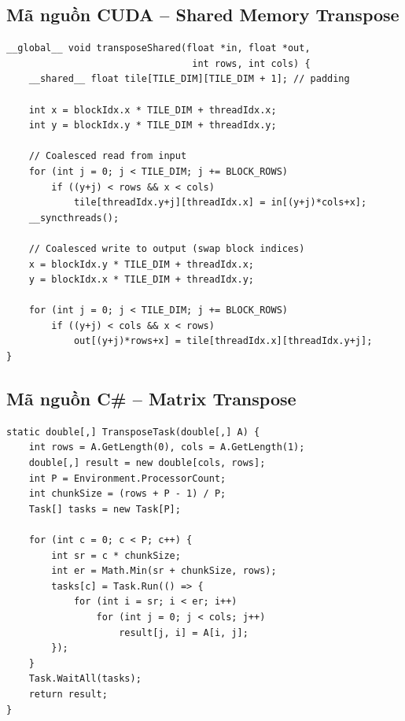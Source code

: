 \documentclass[12pt,a4paper]{article}
\begin{document}
\subsection{Mã nguồn CUDA -- Shared Memory Transpose}

\begin{lstlisting}[style=cudastyle,caption={CUDA Kernel: Shared Memory Transpose}]
__global__ void transposeShared(float *in, float *out,
                                 int rows, int cols) {
    __shared__ float tile[TILE_DIM][TILE_DIM + 1]; // padding

    int x = blockIdx.x * TILE_DIM + threadIdx.x;
    int y = blockIdx.y * TILE_DIM + threadIdx.y;

    // Coalesced read from input
    for (int j = 0; j < TILE_DIM; j += BLOCK_ROWS)
        if ((y+j) < rows && x < cols)
            tile[threadIdx.y+j][threadIdx.x] = in[(y+j)*cols+x];
    __syncthreads();

    // Coalesced write to output (swap block indices)
    x = blockIdx.y * TILE_DIM + threadIdx.x;
    y = blockIdx.x * TILE_DIM + threadIdx.y;

    for (int j = 0; j < TILE_DIM; j += BLOCK_ROWS)
        if ((y+j) < cols && x < rows)
            out[(y+j)*rows+x] = tile[threadIdx.x][threadIdx.y+j];
}
\end{lstlisting}

\subsection{Mã nguồn C\# -- Matrix Transpose}

\begin{lstlisting}[style=csharpstyle,caption={C\# Thread/Task: Matrix Transpose}]
static double[,] TransposeTask(double[,] A) {
    int rows = A.GetLength(0), cols = A.GetLength(1);
    double[,] result = new double[cols, rows];
    int P = Environment.ProcessorCount;
    int chunkSize = (rows + P - 1) / P;
    Task[] tasks = new Task[P];

    for (int c = 0; c < P; c++) {
        int sr = c * chunkSize;
        int er = Math.Min(sr + chunkSize, rows);
        tasks[c] = Task.Run(() => {
            for (int i = sr; i < er; i++)
                for (int j = 0; j < cols; j++)
                    result[j, i] = A[i, j];
        });
    }
    Task.WaitAll(tasks);
    return result;
}
\end{lstlisting}

\end{document}
